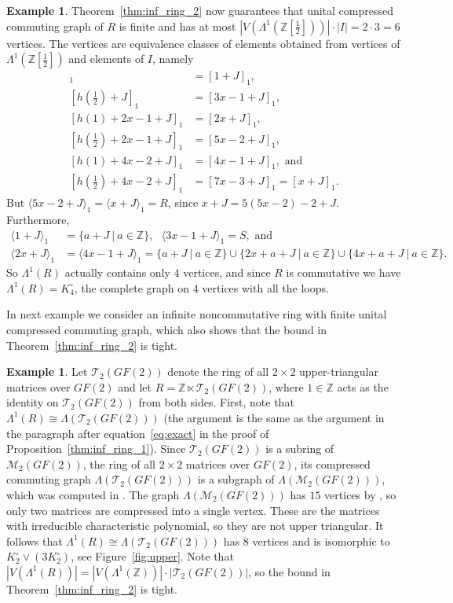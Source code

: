 \documentclass[12pt,a4paper]{amsart}
\theoremstyle{definition}
\newtheorem{example}[proposition]{Example}
\newcommand{\Z}{\mathbb{Z}}
\newcommand{\rng}[1]{\langle #1 \rangle}
\begin{document}
\begin{example}
Theorem~\ref{thm:inf_ring_2} now guarantees that unital compressed commuting graph of $R$ is finite and has at most $|V(\Lambda^1(\Z[\frac12]))| \cdot |I| = 2 \cdot 3 = 6$ vertices. The vertices are equivalence classes of elements obtained from vertices of  $\Lambda^1(\Z[\frac12])$ and elements of $I$, namely 
\begin{align*}
    [h(1) + J]_1 &= [1 + J]_1, \\
    \textstyle[h(\frac12) + J]_1 &= [3x - 1 + J]_1, \\
    [h(1) + 2x - 1 + J]_1 &= [2x + J]_1, \\
    \textstyle[h(\frac12) + 2x - 1 + J]_1 &= [5x - 2 + J]_1, \\
    [h(1) + 4x - 2 + J]_1 &= [4x-1 + J]_1, \text{ and} \\
    \textstyle[h(\frac12) + 4x - 2 + J]_1 &= [7x - 3 + J]_1 = [x + J]_1.
\end{align*}
But  $\rng{5x - 2 + J}_1 = \rng{x + J}_1 = R$, since $x + J = 5(5x-2) -2 + J$. Furthermore, 
\begin{align*}
  \rng{1 + J}_1 &= \{a+J ~|~ a \in \Z\}, \ \ \ \rng{3x-1 + J}_1 = S, \text{ and} \\
  \rng{2x + J}_1 &= \rng{4x-1 + J}_1 =  \{a+J ~|~ a \in \Z\} \cup  \{2x + a+J ~|~ a \in \Z\} \cup  \{4x + a+J ~|~ a \in \Z\}.
\end{align*}
So $\Lambda^1(R)$ actually contains only $4$ vertices, and since $R$ is commutative we have $\Lambda^1(R) = K^\circ_4$, the complete graph on $4$ vertices with all the loops. 
\end{example}

In next example we consider an infinite noncommutative ring with finite unital compressed commuting graph, which also shows that the bound in Theorem~\ref{thm:inf_ring_2} is tight.

\begin{example}\label{ex:T_2}
    Let $\mathcal{T}_2(GF(2))$ denote the ring of all $2 \times 2$ upper-triangular matrices over $GF(2)$ and let $R=\Z \ltimes \mathcal{T}_2(GF(2))$, where $1 \in \Z$ acts as the identity on $\mathcal{T}_2(GF(2))$ from both sides.
    First, note that $\Lambda^1(R) \cong \Lambda(\mathcal{T}_2(GF(2)))$ (the argument is the same as the argument in the paragraph after equation~\eqref{eq:exact} in the proof of Proposition~\ref{thm:inf_ring_1}).
    Since $\mathcal{T}_2(GF(2))$ is a subring of $\mathcal{M}_2(GF(2))$, the ring of all $2 \times 2$ matrices over $GF(2)$, its compressed commuting graph $\Lambda(\mathcal{T}_2(GF(2)))$ is a subgraph of $\Lambda(\mathcal{M}_2(GF(2)))$, which was computed in \cite[Theorem~22]{BoDoKoSt23}. The graph $\Lambda(\mathcal{M}_2(GF(2)))$ has $15$ vertices by \cite[Corollary~23]{BoDoKoSt23}, so only two matrices are compressed into a single vertex. These are the matrices with irreducible characteristic polynomial, so they are not upper triangular.
    It follows that $\Lambda^1(R) \cong \Lambda(\mathcal{T}_2(GF(2)))$ has $8$ vertices and is isomorphic to $K_2^\circ \vee (3K_2^\circ)$, see Figure~\ref{fig:upper}.
    Note that $|V(\Lambda^1(R))|=|V(\Lambda^1(\Z))| \cdot |\mathcal{T}_2(GF(2))|$, so the bound in Theorem~\ref{thm:inf_ring_2} is tight.
\end{example}
\end{document}
